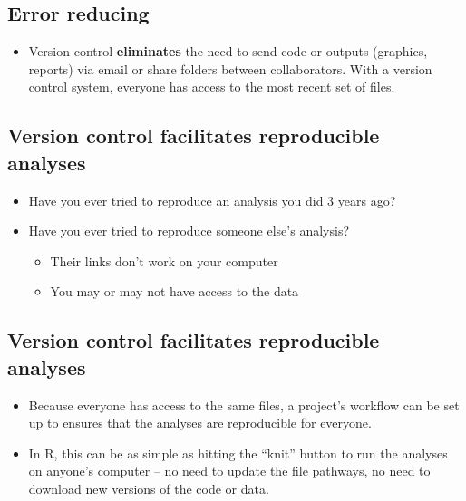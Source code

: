 \documentclass[
]{book}
\providecommand{\tightlist}{%
  \setlength{\itemsep}{0pt}\setlength{\parskip}{0pt}}
\begin{document}
\hypertarget{error-reducing}{%
\subsection{Error reducing}\label{error-reducing}}

\begin{itemize}
\tightlist
\item
  Version control \textbf{eliminates} the need to send code or outputs (graphics,
  reports) via email or share folders between collaborators. With a version
  control system, everyone has access to the most recent set of files.
\end{itemize}

\hypertarget{version-control-facilitates-reproducible-analyses}{%
\subsection{Version control facilitates reproducible analyses}\label{version-control-facilitates-reproducible-analyses}}

\begin{itemize}
\tightlist
\item
  Have you ever tried to reproduce an analysis you did 3 years ago?
\item
  Have you ever tried to reproduce someone else's analysis?

  \begin{itemize}
  \tightlist
  \item
    Their links don't work on your computer
  \item
    You may or may not have access to the data
  \end{itemize}
\end{itemize}

\hypertarget{version-control-facilitates-reproducible-analyses-1}{%
\subsection{Version control facilitates reproducible analyses}\label{version-control-facilitates-reproducible-analyses-1}}

\begin{itemize}
\tightlist
\item
  Because everyone has access to the same files, a project's workflow can be set up
  to ensures that the analyses are reproducible for everyone.
\item
  In R, this can be as simple as hitting the ``knit'' button to run the analyses
  on anyone's computer -- no need to update the file pathways, no need to download
  new versions of the code or data.
\end{itemize}
\end{document}
